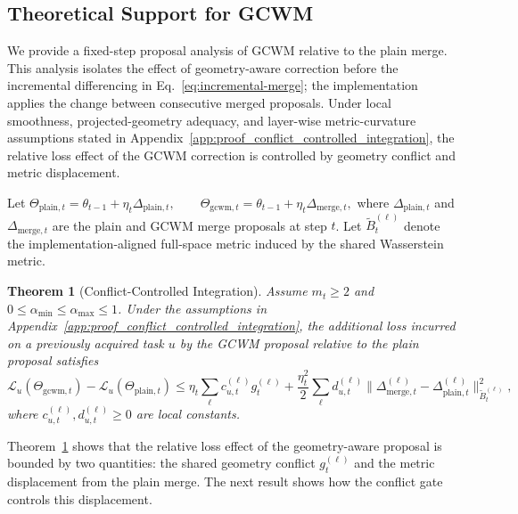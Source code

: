\documentclass{article}
\newtheorem{theorem}{Theorem}
\begin{document}
\subsection{Theoretical Support for GCWM}

We provide a fixed-step proposal analysis of GCWM relative to the plain merge.
This analysis isolates the effect of geometry-aware correction before the incremental differencing in Eq.~\eqref{eq:incremental-merge}; the implementation applies the change between consecutive merged proposals.
Under local smoothness, projected-geometry adequacy, and layer-wise metric-curvature assumptions stated in Appendix~\ref{app:proof_conflict_controlled_integration}, the relative loss effect of the GCWM correction is controlled by geometry conflict and metric displacement.

Let
$\Theta_{\mathrm{plain},t}
=
\theta_{t-1}+\eta_t\Delta_{\mathrm{plain},t},
\qquad
\Theta_{\mathrm{gcwm},t}
=
\theta_{t-1}+\eta_t\Delta_{\mathrm{merge},t},$
where \(\Delta_{\mathrm{plain},t}\) and \(\Delta_{\mathrm{merge},t}\) are the plain and GCWM merge proposals at step \(t\).
Let \(\widetilde B_t^{(\ell)}\) denote the implementation-aligned full-space metric induced by the shared Wasserstein metric.

\begin{theorem}[Conflict-Controlled Integration]
\label{thm:conflict_controlled_integration}
Assume \(m_t\ge2\) and \(0\le \alpha_{\min}\le\alpha_{\max}\le1\).
Under the assumptions in Appendix~\ref{app:proof_conflict_controlled_integration}, the additional loss incurred on a previously acquired task \(u\) by the GCWM proposal relative to the plain proposal satisfies
\begin{equation*}
\mathcal L_u(\Theta_{\mathrm{gcwm},t})
-
\mathcal L_u(\Theta_{\mathrm{plain},t})
\le
\eta_t\sum_\ell c_{u,t}^{(\ell)}g_t^{(\ell)}
+
\frac{\eta_t^2}{2}
\sum_\ell d_{u,t}^{(\ell)}
\bigl\|
\Delta_{\mathrm{merge},t}^{(\ell)}
-
\Delta_{\mathrm{plain},t}^{(\ell)}
\bigr\|_{\widetilde B_t^{(\ell)}}^2,
\end{equation*}
where \(c_{u,t}^{(\ell)},d_{u,t}^{(\ell)}\ge0\) are local constants.
\end{theorem}

Theorem~\ref{thm:conflict_controlled_integration} shows that the relative loss effect of the geometry-aware proposal is bounded by two quantities: the shared geometry conflict \(g_t^{(\ell)}\) and the metric displacement from the plain merge. The next result shows how the conflict gate controls this displacement.
\end{document}
